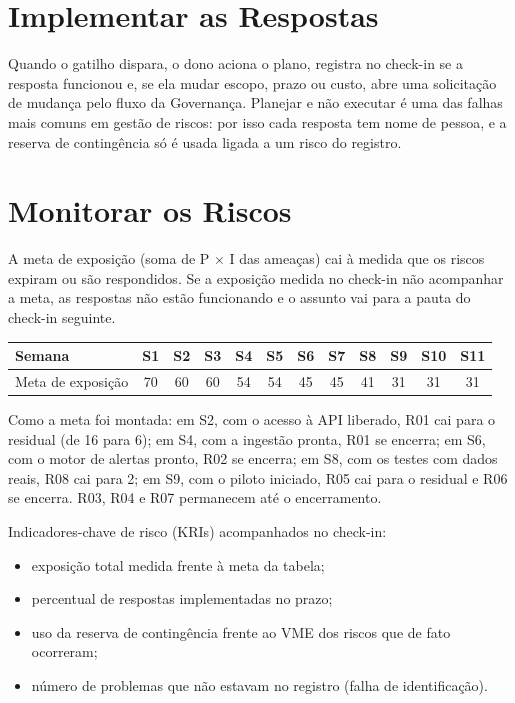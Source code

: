 \documentclass[11pt,a4paper]{article}
\begin{document}
\section{Implementar as Respostas}
Quando o gatilho dispara, o dono aciona o plano, registra no check-in se a resposta funcionou e, se ela mudar escopo, prazo ou custo, abre uma solicitação de mudança pelo fluxo da Governança. Planejar e não executar é uma das falhas mais comuns em gestão de riscos: por isso cada resposta tem nome de pessoa, e a reserva de contingência só é usada ligada a um risco do registro.

\section{Monitorar os Riscos}
A meta de exposição (soma de P $\times$ I das ameaças) cai à medida que os riscos expiram ou são respondidos. Se a exposição medida no check-in não acompanhar a meta, as respostas não estão funcionando e o assunto vai para a pauta do check-in seguinte.

\begin{center}
\footnotesize
\setlength{\tabcolsep}{3pt}
\begin{tabularx}{\textwidth}{l *{11}{C}}
\toprule
\textbf{Semana} & \textbf{S1} & \textbf{S2} & \textbf{S3} & \textbf{S4} & \textbf{S5} & \textbf{S6} & \textbf{S7} & \textbf{S8} & \textbf{S9} & \textbf{S10} & \textbf{S11} \\
\midrule
Meta de exposição & 70 & 60 & 60 & 54 & 54 & 45 & 45 & 41 & 31 & 31 & 31 \\
\bottomrule
\end{tabularx}
\end{center}

\noindent Como a meta foi montada: em S2, com o acesso à API liberado, R01 cai para o residual (de 16 para 6); em S4, com a ingestão pronta, R01 se encerra; em S6, com o motor de alertas pronto, R02 se encerra; em S8, com os testes com dados reais, R08 cai para 2; em S9, com o piloto iniciado, R05 cai para o residual e R06 se encerra. R03, R04 e R07 permanecem até o encerramento.

\noindent Indicadores-chave de risco (KRIs) acompanhados no check-in:
\begin{itemize}[itemsep=2pt]
  \item exposição total medida frente à meta da tabela;
  \item percentual de respostas implementadas no prazo;
  \item uso da reserva de contingência frente ao VME dos riscos que de fato ocorreram;
  \item número de problemas que não estavam no registro (falha de identificação).
\end{itemize}
\end{document}
